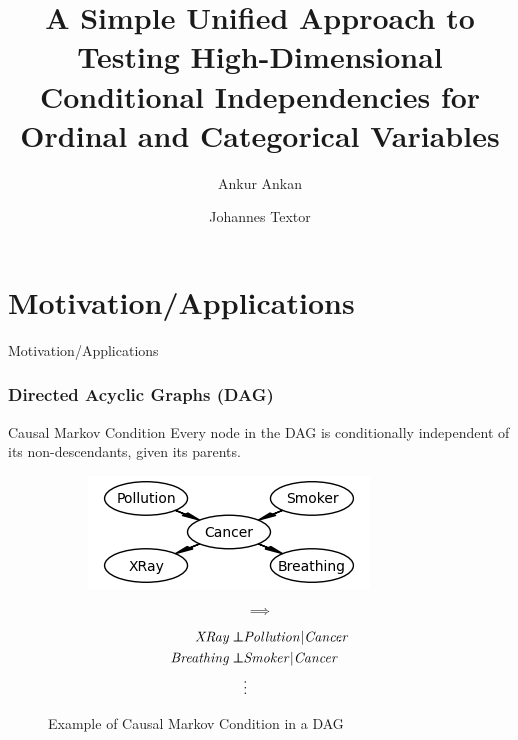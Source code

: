 \documentclass{beamer}
\def\ci{\perp\!\!\!\!\!\perp}
\begin{document}
\title[Unified CI test for Ordinal and Categorical Variables]{A Simple Unified Approach to Testing High-Dimensional Conditional Independencies for Ordinal and Categorical Variables}
\author {Ankur Ankan \and Johannes Textor}
\date{}
\maketitle


\section{Motivation/Applications}
\begin{frame}
	\begin{center} \Huge{Motivation/Applications} \end{center}
\end{frame}
\begin{frame}
	\frametitle{Directed Acyclic Graphs (DAG)}
	\begin{block}{Causal Markov Condition}
		Every node in the DAG is conditionally independent of its non-descendants, given its parents.
	\end{block}
	\vspace{1em}
	\begin{figure}
		\begin{subfigure}{0.46\textwidth}
			\centering
			\includegraphics[scale=0.7]{imgs/example_dag.png}
		\end{subfigure}%
		\begin{subfigure}{0.08\textwidth}
			$$ \bm{\implies} $$
		\end{subfigure}%
		\begin{subfigure}{0.46\textwidth}
			\begin{equation*}
				\begin{split}
					\text{\emph{XRay}} \ci & \text{\emph{Pollution}} | \text{\emph{Cancer}} \\
					\text{\emph{Breathing}} \ci & \text{\emph{Smoker}} | \text{\emph{Cancer}} \\
					& \vdots \\
				\end{split}
			\end{equation*}
		\end{subfigure}
		\caption*{Example of Causal Markov Condition in a DAG \footnotemark}
	\end{figure}
\end{frame}
\end{document}
